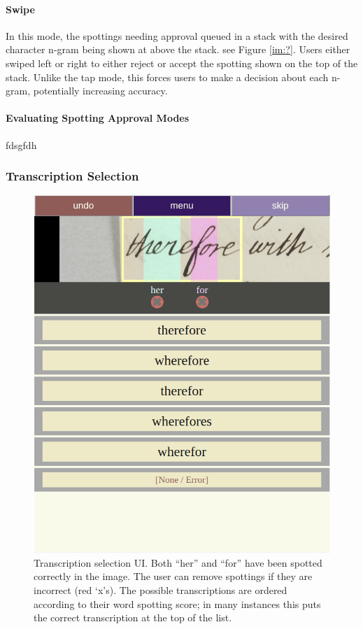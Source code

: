 \documentclass[ms,electronic,twosidetoc,letterpaper,chaptercenter,parttop,lof,lot]{byumsphd}
\begin{document}
\paragraph{Swipe}
In this mode, the spottings needing approval queued in a stack with the desired character n-gram being shown at above the stack. see Figure \ref{im:?}. Users either swiped left or right to either reject or accept the spotting shown on the top of the stack. Unlike the tap mode, this forces users to make a decision about each n-gram, potentially increasing accuracy.


\paragraph{Evaluating Spotting Approval Modes}

fdsgfdh
\fi

\subsubsection{Transcription Selection}\label{transtask}
\begin{figure}
    \centering
    \includegraphics[width=.75\textwidth]{transcriptionselection}
    \caption{Transcription selection UI.  Both ``her'' and ``for'' have been spotted correctly in the image. The user can remove spottings if they are incorrect (red `x's). The possible transcriptions are ordered according to their word spotting score; in many instances this puts the correct transcription at the top of the list.
    }
    \label{fig:transcriptionselection}
\end{figure}
\end{document}
